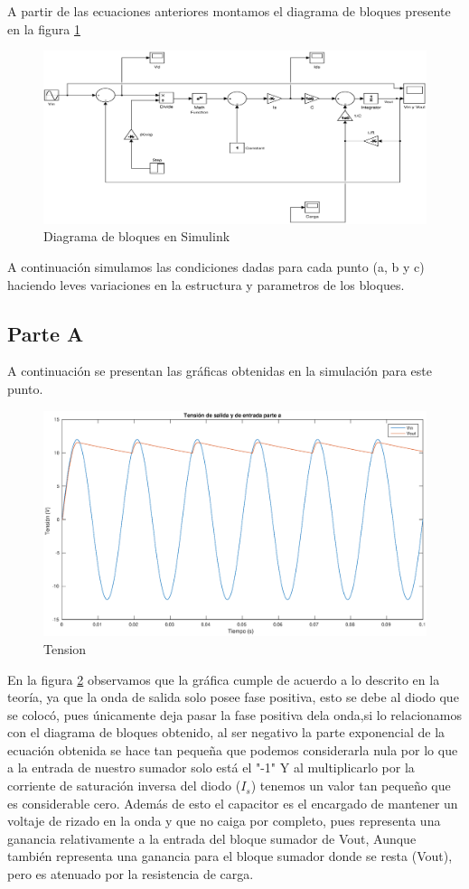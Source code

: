 \documentclass[12pt,letterpaper]{article}
\begin{document}
A partir de las ecuaciones anteriores montamos el diagrama de bloques presente en la figura \ref{fig:diag_bloques_2}


\begin{figure}[ht!]
  \centering
  \includegraphics[width=0.5\linewidth]{pictures/Ejercicio2_Diagrama_Bloques.eps}
  \caption{Diagrama de bloques en Simulink}
  \label{fig:diag_bloques_2}
\end{figure}

A continuación simulamos las condiciones dadas para cada punto (a, b y c) haciendo leves variaciones en la estructura y parametros de los bloques.

\subsection{Parte A}
A continuación se presentan las gráficas obtenidas en la simulación para este punto. 

\begin{figure}[ht!]
  \centering
  \includegraphics[width=0.5\linewidth]{pictures/Ejercicio2_a_Vin_Vout.eps}
  \caption{Tension }
  \label{fig:2_a_Vin_Vout}
\end{figure}

En la figura \ref{fig:2_a_Vin_Vout} observamos que la gráfica cumple de acuerdo a lo descrito en la teoría, ya que la onda de salida solo posee fase positiva, esto se debe al diodo que se colocó, pues únicamente deja pasar la fase positiva dela onda,si lo relacionamos con el diagrama de bloques obtenido, al ser negativo la parte exponencial de la ecuación obtenida  se hace tan pequeña que podemos considerarla nula por lo que a la entrada de nuestro sumador solo está el "-1" Y al multiplicarlo por la corriente de saturación inversa del diodo ($I_s$) tenemos un valor tan pequeño que es considerable cero. Además de esto el capacitor es el encargado de mantener un voltaje de rizado en la onda y que no caiga por completo, pues representa una ganancia relativamente a la entrada del bloque sumador de Vout, Aunque también representa una ganancia para el bloque sumador donde se resta (Vout), pero es atenuado por la resistencia de carga.
\end{document}
